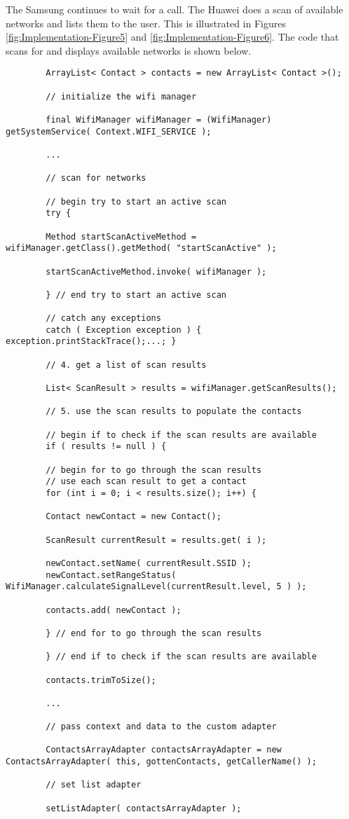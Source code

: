 \documentclass[12pt,svgnames,smaller]{article} %
\begin{document}
		The Samsung continues to wait for a call. The Huawei does a scan of available networks and lists them to the user. This is illustrated in Figures \ref{fig:Implementation-Figure5} and \ref{fig:Implementation-Figure6}.  The code that scans for and displays available networks is shown below.
		
		\begin{verbatim}
		ArrayList< Contact > contacts = new ArrayList< Contact >();
		
		// initialize the wifi manager
		
		final WifiManager wifiManager = (WifiManager) getSystemService( Context.WIFI_SERVICE );
		
		...
		
		// scan for networks
		
		// begin try to start an active scan
		try {
		
		Method startScanActiveMethod = wifiManager.getClass().getMethod( "startScanActive" );
		
		startScanActiveMethod.invoke( wifiManager );
		
		} // end try to start an active scan
		
		// catch any exceptions
		catch ( Exception exception ) { exception.printStackTrace();...; }
		
		// 4. get a list of scan results
		
		List< ScanResult > results = wifiManager.getScanResults();
		
		// 5. use the scan results to populate the contacts
		
		// begin if to check if the scan results are available
		if ( results != null ) {
		
		// begin for to go through the scan results
		// use each scan result to get a contact
		for (int i = 0; i < results.size(); i++) {
		
		Contact newContact = new Contact();
		
		ScanResult currentResult = results.get( i );
		
		newContact.setName( currentResult.SSID );
		newContact.setRangeStatus( WifiManager.calculateSignalLevel(currentResult.level, 5 ) );
		
		contacts.add( newContact );
		
		} // end for to go through the scan results
		
		} // end if to check if the scan results are available
		
		contacts.trimToSize();
		
		...
		
		// pass context and data to the custom adapter
		
		ContactsArrayAdapter contactsArrayAdapter = new ContactsArrayAdapter( this, gottenContacts, getCallerName() );
		
		// set list adapter
		
		setListAdapter( contactsArrayAdapter );       
		\end{verbatim}
		
\end{document}
